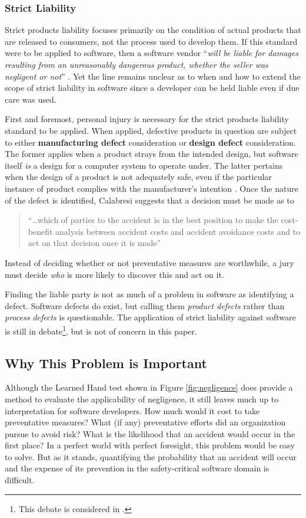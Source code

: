 \subsubsection{Strict Liability}
Strict products liability focuses primarily on the condition of actual products
that are released to consumers, not the process used to develop them. If this
standard were to be applied to software, then a software vendor ``\textit{will be
liable for damages resulting from an unreasonably dangerous product, whether the
seller was negligent or not}'' \cite{Burgunder2004}. Yet the line remains
unclear as to when and how to extend the scope of strict liability in software 
since a developer can be held liable even if due care was used.

First and foremost, personal injury is necessary for the strict products
liability standard to be applied. When applied, defective products in question
are subject to either \textbf{manufacturing defect} consideration or
\textbf{design defect} consideration. The former applies when a product strays
from the intended design, but software itself \textit{is} a design for a
computer system to operate under. The latter pertains when the design of a
product is not adequately safe, even if the particular instance of product
complies with the manufacturer's intention \cite{Turner1999}. Once the nature of
the defect is identified, Calabresi suggests that  a decision must be made as to

\begin{quote}
``\ldots which of parties to the accident is in the best position to make the
cost-benefit analysis between accident costs and accident avoidance costs and to
act on that decision once it is made'' \cite{Calabresi1972}
\end{quote}
 Instead of deciding whether or not preventative
measures are worthwhile, a jury must decide \textit{who} is more likely to 
discover this and act on it.

Finding the liable party is not as much of a problem in software as identifying
a defect. Software defects do exist, but calling them \textit{product defects} 
rather than \textit{process defects} is questionable. The application of strict
liability against software is still in debate\footnote{This debate is considered
in \cite{Turner2000}.}, but is not of concern in this paper.

\subsection{Why This Problem is Important}
Although the Learned Hand test shown in Figure \ref{fig:negligence} does provide
a method to evaluate the applicability of negligence, it still leaves much up to
interpretation for software developers. How much would it cost to take preventative
measures? What (if any) preventative efforts did an organization pursue to avoid
risk? What is the likelihood that an accident would occur in the first place? In
a perfect world with perfect foresight, this problem would be easy to solve. But
as it stands, quantifying the probability that an accident will occur and the
expense of its prevention in the safety-critical software domain is difficult.


